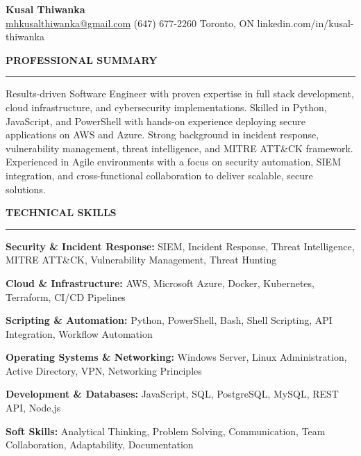 \documentclass[10pt,letterpaper]{article}
\begin{document}
\begin{center}
{\LARGE\textbf{Kusal Thiwanka}}\\[3pt]
\href{mailto:mhkusalthiwanka@gmail.com}{mhkusalthiwanka@gmail.com}\hspace{2em}%
(647) 677{-}2260\hspace{2em}%
Toronto, ON\hspace{2em}
linkedin.com/in/kusal-thiwanka
\end{center}

\vspace{6pt}

\textbf{PROFESSIONAL SUMMARY}\\[-8pt]
\noindent\rule{\textwidth}{1pt}

\vspace{-2pt}

Results-driven Software Engineer with proven expertise in full stack development, cloud infrastructure, and cybersecurity implementations. Skilled in Python, JavaScript, and PowerShell with hands-on experience deploying secure applications on AWS and Azure. Strong background in incident response, vulnerability management, threat intelligence, and MITRE ATT\&CK framework. Experienced in Agile environments with a focus on security automation, SIEM integration, and cross-functional collaboration to deliver scalable, secure solutions.

\vspace{8pt}

\textbf{TECHNICAL SKILLS}\\[-8pt]
\noindent\rule{\textwidth}{1pt}

\vspace{-2pt}

\textbf{Security \& Incident Response:} SIEM, Incident Response, Threat Intelligence, MITRE ATT\&CK, Vulnerability Management, Threat Hunting

\textbf{Cloud \& Infrastructure:} AWS, Microsoft Azure, Docker, Kubernetes, Terraform, CI/CD Pipelines

\textbf{Scripting \& Automation:} Python, PowerShell, Bash, Shell Scripting, API Integration, Workflow Automation

\textbf{Operating Systems \& Networking:} Windows Server, Linux Administration, Active Directory, VPN, Networking Principles

\textbf{Development \& Databases:} JavaScript, SQL, PostgreSQL, MySQL, REST API, Node.js

\textbf{Soft Skills:} Analytical Thinking, Problem Solving, Communication, Team Collaboration, Adaptability, Documentation
\end{document}
